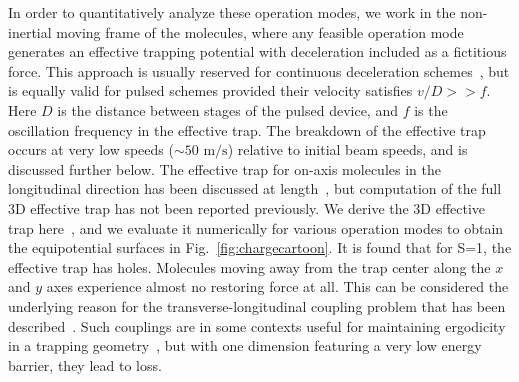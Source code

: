 \documentclass[%
 reprint,
 amsmath,amssymb,
 aps,
prl,
]{revtex4-1}
\begin{document}
In order to quantitatively analyze these operation modes, we work in the non-inertial moving frame of the molecules, where any feasible operation mode generates an effective trapping potential with deceleration included as a fictitious force. 
This approach is usually reserved for continuous deceleration schemes~\cite{Osterwalder2010,Narevicius2008}, but is equally valid for pulsed schemes provided their velocity satisfies $v/D >> f$. 
Here $D$ is the distance between stages of the pulsed device, and $f$ is the oscillation frequency in the effective trap. 
The breakdown of the effective trap occurs at very low speeds ($\sim\!\!50\text{ m/s}$) relative to initial beam speeds, and is discussed further below.
The effective trap for on-axis molecules in the longitudinal direction has been discussed at length~\cite{Bethlem2000,Hudson2004}, but computation of the full 3D effective trap has not been reported previously.
We derive the 3D effective trap here~\cite{ssm}, and we evaluate it numerically for various operation modes to obtain the equipotential surfaces in Fig.~\ref{fig:chargecartoon}.
It is found that for S=1, the effective trap has holes. 
Molecules moving away from the trap center along the $x$ and $y$ axes experience almost no restoring force at all. 
This can be considered the underlying reason for the transverse-longitudinal coupling problem that has been described~\cite{VanDeMeerakker2006}. 
Such couplings are in some contexts useful for maintaining ergodicity in a trapping geometry~\cite{Surkov1996}, but with one dimension featuring a very low energy barrier, they lead to loss.
\end{document}
